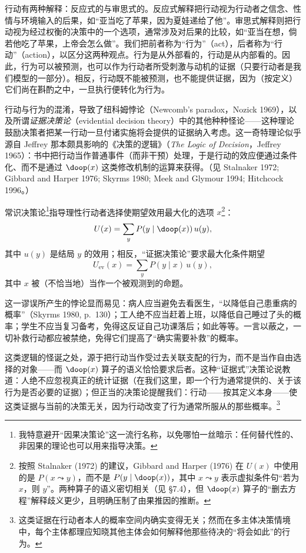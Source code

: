 行动有两种解释：反应式的与审思式的。反应式解释把行动视为行动者之信念、性情与环境输入的后果，如“亚当吃了苹果，因为夏娃递给了他”。审思式解释则把行动视为经过权衡的决策中的一个选项，通常涉及对后果的比较，如“亚当在想，倘若他吃了苹果，上帝会怎么做”。我们把前者称为“行为”（act），后者称为“行动”（action），以区分这两种观点。行为是从外部看的，行动是从内部看的。因此，行为可以被预测，也可以作为行动者所受刺激与动机的证据（只要行动者是我们模型的一部分）。相反，行动既不能被预测，也不能提供证据，因为（按定义）它们尚在斟酌之中，一旦执行便转化为行为。

行动与行为的混淆，导致了纽科姆悖论（Newcomb's paradox，Nozick 1969），以及所谓\emph{证据决策论}（evidential decision theory）中的其他种种怪论——这种理论鼓励决策者把某一行动一旦付诸实施将会提供的证据纳入考虑。这一奇特理论似乎源自 Jeffrey 那本颇具影响的《决策的逻辑》（\textit{The Logic of Decision}，Jeffrey 1965）：书中把行动当作普通事件（而非干预）处理，于是行动的效应便通过条件化、而不是通过 $\doop(x)$ 这类修改机制的运算来获得。（见 Stalnaker 1972; Gibbard and Harper 1976; Skyrms 1980; Meek and Glymour 1994; Hitchcock 1996。）

常识决策论\footnote{我特意避开“因果决策论”这一流行名称，以免哪怕一丝暗示：任何替代性的、非因果的理论也可以用来指导决策。}指导理性行动者选择使期望效用最大化的选项 $x$\footnote{按照 Stalnaker (1972) 的建议，Gibbard and Harper (1976) 在 $U(x)$ 中使用的是 $P(x\leadsto y)$，而不是 $P(y\mid\doop(x))$，其中 $x\leadsto y$ 表示虚拟条件句“若为 $x$，则 $y$”。两种算子的语义密切相关（见 \S 7.4），但 $\doop(x)$ 算子的“删去方程”解释歧义更少，且明确压制了由果推因的推断。}：
\[
U(x) = \sum_y P(y\mid\doop(x))\,u(y),
\]
其中 $u(y)$ 是结局 $y$ 的效用；相反，“证据决策论”要求最大化条件期望
\[
U_{\mathrm{ev}}(x) = \sum_y P(y\mid x)\,u(y),
\]
其中 $x$ 被（不恰当地）当作一个被观测到的命题。

这一谬误所产生的悖论显而易见：病人应当避免去看医生，“以降低自己患重病的概率”（Skyrms 1980, p.~130）；工人绝不应当赶着上班，以降低自己睡过了头的概率；学生不应当复习备考，免得这反证自己功课落后；如此等等。一言以蔽之，一切补救行动都应被禁绝，免得它们提高了“确实需要补救”的概率。

这类逻辑的怪诞之处，源于把行动当作受过去关联支配的行为，而不是当作自由选择的对象——而 $\doop(x)$ 算子的语义恰恰要求后者。这种“证据式”决策论说教道：人绝不应忽视真正的统计证据（在我们这里，即一个行为通常提供的、关于该行为是否必要的证据）；但正当的决策论提醒我们：行动——按其定义本身——使这类证据与当前的决策无关，因为行动改变了行为通常所服从的那些概率。\footnote{这类证据在行动者本人的概率空间内确实变得无关；然而在多主体决策情境中，每个主体都理应知晓其他主体会如何解释他那些待决的“将会如此”的行为。}

